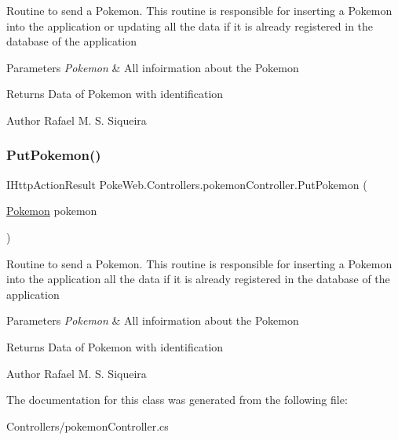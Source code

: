 Routine to send a Pokemon. This routine is responsible for inserting a Pokemon into the application or updating all the data if it is already registered in the database of the application


\begin{DoxyParams}{Parameters}
{\em Pokemon} & All infoirmation about the Pokemon \\
\hline
\end{DoxyParams}
\begin{DoxyReturn}{Returns}
Data of Pokemon with identification 
\end{DoxyReturn}
\begin{DoxyAuthor}{Author}
Rafael M. S. Siqueira 
\end{DoxyAuthor}
\mbox{\label{class_poke_web_1_1_controllers_1_1pokemon_controller_a155329861c4235adf1e8ebf27c3fa19e}} 
\subsubsection{\texorpdfstring{Put\+Pokemon()}{PutPokemon()}}
{\footnotesize\ttfamily I\+Http\+Action\+Result Poke\+Web.\+Controllers.\+pokemon\+Controller.\+Put\+Pokemon (\begin{DoxyParamCaption}\item[{\mbox{\hyperlink{class_poke_web_1_1_models_1_1_pokemon}{Pokemon}}}]{pokemon }\end{DoxyParamCaption})\hspace{0.3cm}{\ttfamily [inline]}}

Routine to send a Pokemon. This routine is responsible for inserting a Pokemon into the application all the data if it is already registered in the database of the application


\begin{DoxyParams}{Parameters}
{\em Pokemon} & All infoirmation about the Pokemon \\
\hline
\end{DoxyParams}
\begin{DoxyReturn}{Returns}
Data of Pokemon with identification 
\end{DoxyReturn}
\begin{DoxyAuthor}{Author}
Rafael M. S. Siqueira 
\end{DoxyAuthor}


The documentation for this class was generated from the following file\+:\begin{DoxyCompactItemize}
\item 
Controllers/pokemon\+Controller.\+cs\end{DoxyCompactItemize}
